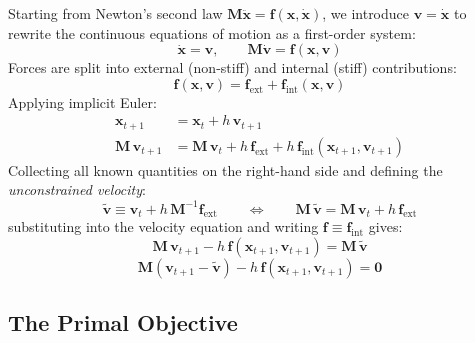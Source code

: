 \documentclass{article}
\begin{document}
\begin{derivation}
Starting from Newton's second law $\mathbf{M}\ddot{\mathbf{x}} = \mathbf{f}(\mathbf{x}, \dot{\mathbf{x}})$, we introduce $\mathbf{v} = \dot{\mathbf{x}}$ 
to rewrite the continuous equations of motion as a first-order system:
%
\begin{equation*}
    \dot{\mathbf{x}} = \mathbf{v}, 
    \qquad 
    \mathbf{M}\dot{\mathbf{v}} = \mathbf{f}(\mathbf{x}, \mathbf{v})
\end{equation*}
%
Forces are split into external (non-stiff) and internal (stiff) contributions:
%
\begin{equation*}
    \mathbf{f}(\mathbf{x}, \mathbf{v}) = \mathbf{f}_{\text{ext}} + 
    \mathbf{f}_{\text{int}}(\mathbf{x}, \mathbf{v})
\end{equation*}
%
Applying implicit Euler:
%
\begin{equation*}
\begin{aligned}
    \mathbf{x}_{t+1} &= \mathbf{x}_t + h\,\mathbf{v}_{t+1}
    \\[1ex]
    \mathbf{M}\,\mathbf{v}_{t+1} &= \mathbf{M}\,\mathbf{v}_t + 
    h\,\mathbf{f}_{\text{ext}} + h\,\mathbf{f}_{\text{int}}(\mathbf{x}_{t+1}, \mathbf{v}_{t+1})
\end{aligned}
\end{equation*}
%
Collecting all known quantities on the right-hand side and defining 
the \textit{unconstrained velocity}:
%
\begin{equation*}
    \tilde{\mathbf{v}} \equiv \mathbf{v}_t + h\,\mathbf{M}^{-1}\mathbf{f}_{\text{ext}}
    \qquad \Longleftrightarrow \qquad
    \mathbf{M}\,\tilde{\mathbf{v}} = \mathbf{M}\,\mathbf{v}_t + h\,\mathbf{f}_{\text{ext}}
\end{equation*}
%
substituting into the velocity equation and writing 
$\mathbf{f} \equiv \mathbf{f}_{\text{int}}$ gives:
%
\begin{equation*}
    \mathbf{M}\,\mathbf{v}_{t+1} - h\,\mathbf{f}(\mathbf{x}_{t+1}, \mathbf{v}_{t+1}) 
    = \mathbf{M}\,\tilde{\mathbf{v}}
\end{equation*}
\begin{equation*}
    \mathbf{M}(\mathbf{v}_{t+1} - \tilde{\mathbf{v}}) - 
    h\,\mathbf{f}(\mathbf{x}_{t+1},\mathbf{v}_{t+1}) = \mathbf{0}
\end{equation*}
\end{derivation}

\subsection{The Primal Objective}
\end{document}
